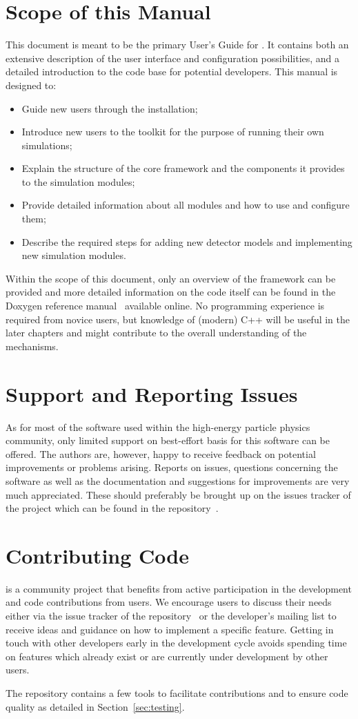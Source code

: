 \section{Scope of this Manual}
This document is meant to be the primary User's Guide for \apsq.
It contains both an extensive description of the user interface and configuration possibilities, and a detailed introduction to the code base for potential developers.
This manual is designed to:
\begin{itemize}
\item Guide new users through the installation;
\item Introduce new users to the toolkit for the purpose of running their own simulations;
\item Explain the structure of the core framework and the components it provides to the simulation modules;
\item Provide detailed information about all modules and how to use and configure them;
\item Describe the required steps for adding new detector models and implementing new simulation modules.
\end{itemize}

Within the scope of this document, only an overview of the framework can be provided and more detailed information on the code itself can be found in the Doxygen reference manual~\cite{ap2-doxygen} available online.
No programming experience is required from novice users, but knowledge of (modern) C++ will be useful in the later chapters and might contribute to the overall understanding of the mechanisms.

\section{Support and Reporting Issues}
As for most of the software used within the high-energy particle physics community, only limited support on best-effort basis for this software can be offered.
The authors are, however, happy to receive feedback on potential improvements or problems arising.
Reports on issues, questions concerning the software as well as the documentation and suggestions for improvements are very much appreciated.
These should preferably be brought up on the issues tracker of the project which can be found in the repository~\cite{ap2-issue-tracker}.


\section{Contributing Code}
\apsq is a community project that benefits from active participation in the development and code contributions from users.
We encourage users to discuss their needs either via the issue tracker of the repository~\cite{ap2-issue-tracker} or the developer's mailing list to receive ideas and guidance on how to implement a specific feature.
Getting in touch with other developers early in the development cycle avoids spending time on features which already exist or are currently under development by other users.

The repository contains a few tools to facilitate contributions and to ensure code quality as detailed in Section~\ref{sec:testing}.
